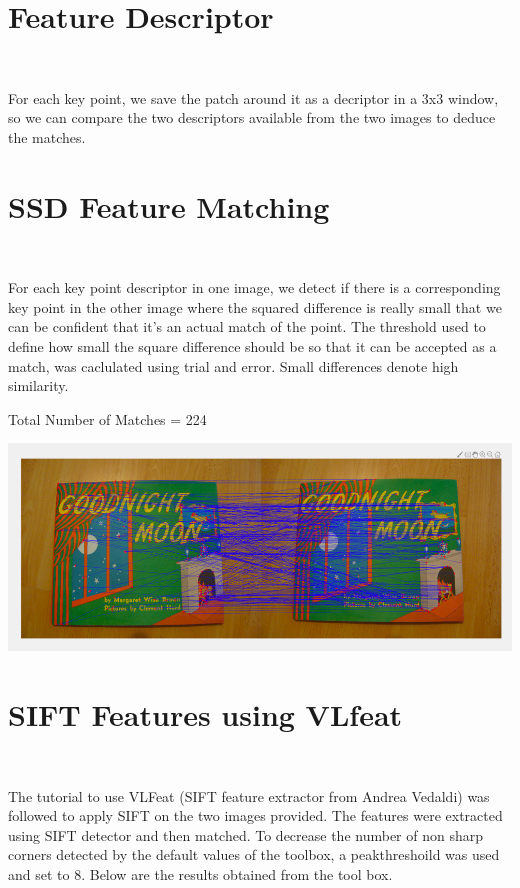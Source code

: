 \documentclass[]{article}
\begin{document}
\section{Feature Descriptor}\

For each key point, we save the patch around it as a decriptor in a 3x3 window, so we can compare the two descriptors available from the two images to deduce the matches.

\section{SSD Feature Matching}\

For each key point descriptor in one image, we detect if there is a corresponding key point in the other image where the squared difference is really small that we can be confident that it's an actual match of the point. The threshold used to define how small the square difference should be so that it can be accepted as a match, was caclulated using trial and error. Small differences denote high similarity.

Total Number of Matches =  224

\includegraphics{harris_matching.png}

\section{SIFT Features using VLfeat}\

The tutorial to use VLFeat (SIFT feature extractor from Andrea Vedaldi) was followed to apply SIFT on the two images provided. The features were extracted using SIFT detector and then matched.
To decrease the number of non sharp corners detected by the default values of the toolbox, a peakthreshoild was used and set to 8. Below are the results obtained from the tool box. \newline
\end{document}
